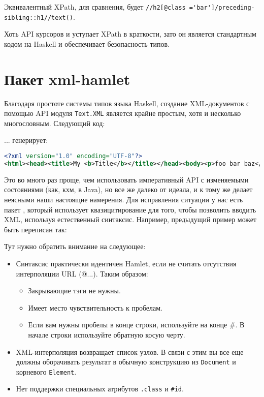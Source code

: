 \begin{remark}
Эквивалентный XPath, для сравнения, будет \lstinline!//h2[@class ='bar']/preceding-sibling::h1//text()!.
\end{remark}

Хоть API курсоров и уступает XPath в краткости, зато он является стандартным кодом на Haskell и обеспечивает безопасность типов.

\section{Пакет xml-hamlet}

Благодаря простоте системы типов языка Haskell, создание XML-документов с помощью API модуля \lstinline!Text.XML! является крайне простым, хотя и несколько многословным. Следующий код:



... генерирует:

\begin{lstlisting}[language=XML]
<?xml version="1.0" encoding="UTF-8"?>
<html><head><title>My <b>Title</b></title></head><body><p>foo bar baz</p></body></html>
\end{lstlisting}

Это во много раз проще, чем использовать императивный API с изменяемыми состояниями (как, кхм, в Java), но все же далеко от идеала, и к тому же делает неясными наши настоящие намерения. Для исправления ситуации у нас есть пакет , который использует квазицитирование для того, чтобы позволить вводить XML, используя естественный синтаксис. Например, предыдущий пример может быть переписан так:



Тут нужно обратить внимание на следующее:

\begin{itemize}
  \item Синтаксис практически идентичен Hamlet, если не считать отсутствия интерполяции URL (@{...}). Таким образом:
    \begin{itemize}
      \item Закрывающие тэги не нужны.
      \item Имеет место чувствительность к пробелам.
      \item Если вам нужны пробелы в конце строки, используйте на конце \#. В начале строки используйте обратную косую черту.
    \end{itemize}
  
  \item XML-интерполяция возвращает список узлов. В связи с этим вы все еще должны оборачивать результат в обычную конструкцию из \lstinline!Document! и корневого \lstinline!Element!.
  \item Нет поддержки специальных атрибутов \lstinline!.class! и \lstinline!#id!.
\end{itemize}

